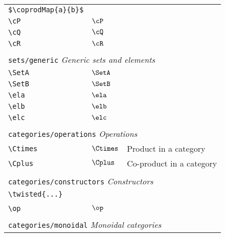 \begin{longtable}{lll}
{{\begin{minipage}[]{5cm}
{\footnotesize{\texttt{\$\textbackslash coprodMap\{a\}\{b\}\$}}}\end{minipage}%
}%
}%
\\ 
 {\color[rgb]{0.5,0.5,0.5}\texttt{\textbackslash cP}} & $\cP$ & \\ 
 {\color[rgb]{0.5,0.5,0.5}\texttt{\textbackslash cQ}} & $\cQ$ & \\ 
 {\color[rgb]{0.5,0.5,0.5}\texttt{\textbackslash cR}} & $\cR$ & \\ 
  &  & \\ 
 \multicolumn{3}{l}{{\color[rgb]{0.5,0.5,0.5}\texttt{sets/generic}} \emph{Generic sets and elements}}\\ 
 \hline
{\color[rgb]{0.5,0.5,0.5}\texttt{\textbackslash SetA}} & $\SetA$ & \\ 
 {\color[rgb]{0.5,0.5,0.5}\texttt{\textbackslash SetB}} & $\SetB$ & \\ 
 {\color[rgb]{0.5,0.5,0.5}\texttt{\textbackslash ela}} & $\ela$ & \\ 
 {\color[rgb]{0.5,0.5,0.5}\texttt{\textbackslash elb}} & $\elb$ & \\ 
 {\color[rgb]{0.5,0.5,0.5}\texttt{\textbackslash elc}} & $\elc$ & \\ 
  &  & \\ 
 \multicolumn{3}{l}{{\color[rgb]{0.5,0.5,0.5}\texttt{categories/operations}} \emph{Operations}}\\ 
 \hline
{\color[rgb]{0.5,0.5,0.5}\texttt{\textbackslash Ctimes}} & $\Ctimes$ &  Product in a category\\ 
 {\color[rgb]{0.5,0.5,0.5}\texttt{\textbackslash Cplus}} & $\Cplus$ &  Co-product in a category\\ 
  &  & \\ 
 \multicolumn{3}{l}{{\color[rgb]{0.5,0.5,0.5}\texttt{categories/constructors}} \emph{Constructors}}\\ 
 \hline
{\color[rgb]{0.5,0.5,0.5}\texttt{\textbackslash twisted\{...\}}} &  & \\ 
  &  & {\setlength\fboxsep{1pt}%
\fbox{%
\color[rgb]{0.5,0.5,0.5}\begin{minipage}[]{5cm}%
$\twisted{a}$\par%
{\footnotesize{\texttt{\$\textbackslash twisted\{a\}\$}}}\end{minipage}%
}%
}%
\\ 
 {\color[rgb]{0.5,0.5,0.5}\texttt{\textbackslash op}} & $\op$ & \\ 
  &  & \\ 
 \multicolumn{3}{l}{{\color[rgb]{0.5,0.5,0.5}\texttt{categories/monoidal}} \emph{Monoidal categories}}\\ 

\end{longtable}
